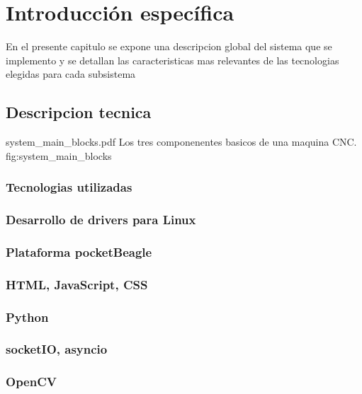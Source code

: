 \chapter{Introducción específica} %

\label{Chapter2}

En el presente capitulo se expone una descripcion global del sistema que se implemento y se detallan las caracteristicas mas relevantes de las tecnologias elegidas para cada subsistema

\section{Descripcion tecnica}

         {system_main_blocks.pdf}
         {Los tres componenentes basicos de una maquina CNC.}
         {fig:system_main_blocks}

\subsection{Tecnologias utilizadas}
\subsection{Desarrollo de drivers para Linux}
\subsection{Plataforma pocketBeagle}
\subsection{HTML, JavaScript, CSS}
\subsection{Python}
\subsection{socketIO, asyncio}
\subsection{OpenCV}

